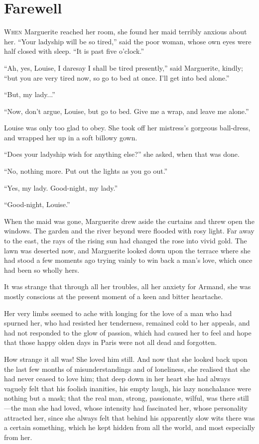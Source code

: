 
\chapter{Farewell}
\lettrine[lines=4]{W}{hen} Marguerite reached her room, she found her maid terribly anxious about her. \enquote{Your ladyship will be so tired,} said the poor woman, whose own eyes were half closed with sleep. \enquote{It is past five o'clock.}

\enquote{Ah, yes, Louise, I daresay I shall be tired presently,} said Marguerite, kindly; \enquote{but you are very tired now, so go to bed at once. I'll get into bed alone.}

\enquote{But, my lady...}

\enquote{Now, don't argue, Louise, but go to bed. Give me a wrap, and leave me alone.}

Louise was only too glad to obey. She took off her mistress's gorgeous ball-dress, and wrapped her up in a soft billowy gown.

\enquote{Does your ladyship wish for anything else?} she asked, when that was done.

\enquote{No, nothing more. Put out the lights as you go out.}

\enquote{Yes, my lady. Good-night, my lady.}

\enquote{Good-night, Louise.}

When the maid was gone, Marguerite drew aside the curtains and threw open the windows. The garden and the river beyond were flooded with rosy light. Far away to the east, the rays of the rising sun had changed the rose into vivid gold. The lawn was deserted now, and Marguerite looked down upon the terrace where she had stood a few moments ago trying vainly to win back a man's love, which once had been so wholly hers.

It was strange that through all her troubles, all her anxiety for Armand, she was mostly conscious at the present moment of a keen and bitter heartache.

Her very limbs seemed to ache with longing for the love of a man who had spurned her, who had resisted her tenderness, remained cold to her appeals, and had not responded to the glow of passion, which had caused her to feel and hope that those happy olden days in Paris were not all dead and forgotten.

How strange it all was! She loved him still. And now that she looked back upon the last few months of misunderstandings and of loneliness, she realised that she had never ceased to love him; that deep down in her heart she had always vaguely felt that his foolish inanities, his empty laugh, his lazy nonchalance were nothing but a mask; that the real man, strong, passionate, wilful, was there still---the man she had loved, whose intensity had fascinated her, whose personality attracted her, since she always felt that behind his apparently slow wits there was a certain something, which he kept hidden from all the world, and most especially from her.

